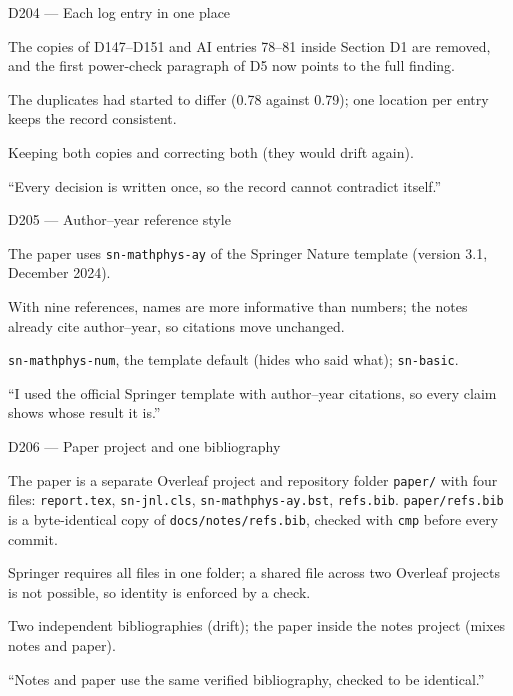 \documentclass[11pt,a4paper]{report}
\begin{document}
\begin{decisionbox}{D204 --- Each log entry in one place}
\begin{description}[nosep, leftmargin=0pt]
  \item[Decision.] The copies of D147--D151 and AI entries 78--81 inside
    Section D1 are removed, and the first power-check paragraph of D5 now
    points to the full finding.
  \item[Why.] The duplicates had started to differ (0.78 against 0.79); one
    location per entry keeps the record consistent.
  \item[Alternatives.] Keeping both copies and correcting both (they would
    drift again).
  \item[Interview line.] ``Every decision is written once, so the record
    cannot contradict itself.''
\end{description}
\end{decisionbox}

\begin{decisionbox}{D205 --- Author--year reference style}
\begin{description}[nosep, leftmargin=0pt]
  \item[Decision.] The paper uses \texttt{sn-mathphys-ay} of the Springer Nature template (version 3.1, December 2024).
  \item[Why.] With nine references, names are more informative than numbers; the notes already cite author--year, so citations move unchanged.
  \item[Alternatives.] \texttt{sn-mathphys-num}, the template default (hides who said what); \texttt{sn-basic}.
  \item[Interview line.] ``I used the official Springer template with author--year citations, so every claim shows whose result it is.''
\end{description}
\end{decisionbox}

\begin{decisionbox}{D206 --- Paper project and one bibliography}
\begin{description}[nosep, leftmargin=0pt]
  \item[Decision.] The paper is a separate Overleaf project and repository folder \texttt{paper/} with four files: \texttt{report.tex}, \texttt{sn-jnl.cls}, \texttt{sn-mathphys-ay.bst}, \texttt{refs.bib}. \texttt{paper/refs.bib} is a byte-identical copy of \texttt{docs/notes/refs.bib}, checked with \texttt{cmp} before every commit.
  \item[Why.] Springer requires all files in one folder; a shared file across two Overleaf projects is not possible, so identity is enforced by a check.
  \item[Alternatives.] Two independent bibliographies (drift); the paper inside the notes project (mixes notes and paper).
  \item[Interview line.] ``Notes and paper use the same verified bibliography, checked to be identical.''
\end{description}
\end{decisionbox}
\end{document}
